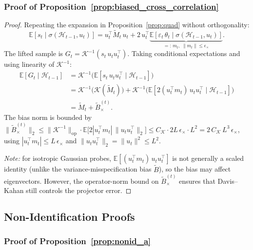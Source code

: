 \documentclass{article}
\newcommand{\E}{\mathbb{E}}
\newcommand{\op}{\mathrm{op}}
\newcommand{\cH}{\mathcal{H}}
\begin{document}
\subsubsection{Proof of Proposition~\ref{prop:biased_cross_correlation}}
\label{proof:biased_cross_correlation}


  \begin{proof}
  Repeating the expansion in Proposition~\ref{prop:quad} without orthogonality:
  \[
  \E[s_t \mid \sigma(\cH_{t-1},u_t)]
  = u_t^\top \widetilde M_t\, u_t
  + 2\,u_t^\top \underbrace{\E[\varepsilon_t\,\theta_t \mid
  \sigma(\cH_{t-1},u_t)]}_{=:\,m_t,\;\|m_t\|\le\epsilon_\times}.
  \]
  The lifted sample is $G_t = \mathcal K^{-1}(s_t\,u_tu_t^\top)$.
  Taking conditional expectations and using linearity of $\mathcal K^{-1}$:
  \begin{align*}
  \E[G_t \mid \cH_{t-1}]
  &= \mathcal K^{-1}\!\bigl(\E[s_t\,u_tu_t^\top \mid \cH_{t-1}]\bigr) \\
  &= \mathcal K^{-1}\!\bigl(\mathcal K(\widetilde M_t)\bigr)
    + \mathcal K^{-1}\!\bigl(\E[2(u_t^\top m_t)\,u_tu_t^\top \mid \cH_{t-1}]\bigr) \\
  &= \widetilde M_t + \widetilde B_\times^{(t)}.
  \end{align*}
  The bias norm is bounded by
  $\|\widetilde B_\times^{(t)}\|_2
  \le \|\mathcal K^{-1}\|_{\op}\cdot\E\bigl[2|u_t^\top m_t|\,\|u_tu_t^\top\|_2\bigr]
  \le C_{\mathcal K}\cdot 2L\,\epsilon_\times\cdot L^2
  = 2\,C_{\mathcal K}\,L^3\,\epsilon_\times$,
  using $|u_t^\top m_t|\le L\,\epsilon_\times$ and $\|u_tu_t^\top\|_2 = \|u_t\|^2 \le L^2$.

  \emph{Note:} for isotropic Gaussian probes, $\E[(u_t^\top m_t)\,u_tu_t^\top]$
  is not generally a scaled identity (unlike the variance-misspecification bias
  $\widetilde B$), so the bias may affect eigenvectors.  However, the operator-norm
  bound on $\widetilde B_\times^{(t)}$ ensures that Davis--Kahan still controls
  the projector error.
  \end{proof}
\subsection{Non-Identification Proofs}

\subsubsection{Proof of Proposition~\ref{prop:nonid_a}}
\label{proof:nonid_a}
\end{document}
